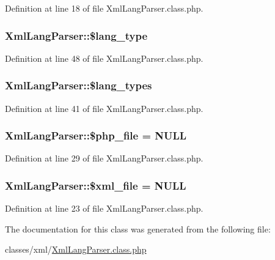 Definition at line 18 of file Xml\+Lang\+Parser.\+class.\+php.

\hypertarget{classXmlLangParser_ac1289e1d349c8e40ef4afd26941cba5d}{
\subsubsection[{\$lang\+\_\+type}]{\setlength{\rightskip}{0pt plus 5cm}Xml\+Lang\+Parser\+::\$lang\+\_\+type}}\label{classXmlLangParser_ac1289e1d349c8e40ef4afd26941cba5d}


Definition at line 48 of file Xml\+Lang\+Parser.\+class.\+php.

\hypertarget{classXmlLangParser_a0385e815b92b65f3b3d12a29e54d1e36}{
\subsubsection[{\$lang\+\_\+types}]{\setlength{\rightskip}{0pt plus 5cm}Xml\+Lang\+Parser\+::\$lang\+\_\+types}}\label{classXmlLangParser_a0385e815b92b65f3b3d12a29e54d1e36}


Definition at line 41 of file Xml\+Lang\+Parser.\+class.\+php.

\hypertarget{classXmlLangParser_a0f8639ef765df04b8c4e7903de4353bb}{
\subsubsection[{\$php\+\_\+file}]{\setlength{\rightskip}{0pt plus 5cm}Xml\+Lang\+Parser\+::\$php\+\_\+file = N\+U\+L\+L}}\label{classXmlLangParser_a0f8639ef765df04b8c4e7903de4353bb}


Definition at line 29 of file Xml\+Lang\+Parser.\+class.\+php.

\hypertarget{classXmlLangParser_a95de36282488ee37a0ef18ef85a6697c}{
\subsubsection[{\$xml\+\_\+file}]{\setlength{\rightskip}{0pt plus 5cm}Xml\+Lang\+Parser\+::\$xml\+\_\+file = N\+U\+L\+L}}\label{classXmlLangParser_a95de36282488ee37a0ef18ef85a6697c}


Definition at line 23 of file Xml\+Lang\+Parser.\+class.\+php.



The documentation for this class was generated from the following file\+:\begin{DoxyCompactItemize}
\item 
classes/xml/\hyperlink{XmlLangParser_8class_8php}{Xml\+Lang\+Parser.\+class.\+php}\end{DoxyCompactItemize}
